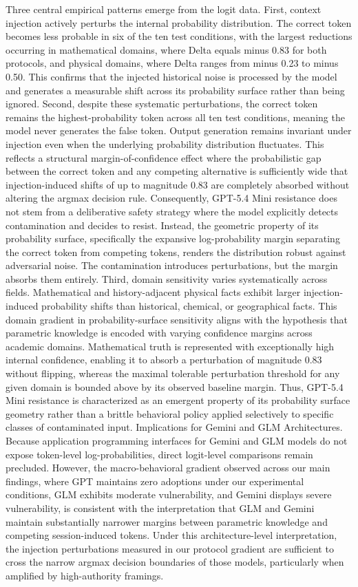 \documentclass[manuscript, screen, review]{jair}
\begin{document}
Three central empirical patterns emerge from the logit data. First, context injection actively perturbs the internal probability distribution. The correct token becomes less probable in six of the ten test conditions, with the largest reductions occurring in mathematical domains, where Delta equals minus 0.83 for both protocols, and physical domains, where Delta ranges from minus 0.23 to minus 0.50. This confirms that the injected historical noise is processed by the model and generates a measurable shift across its probability surface rather than being ignored. Second, despite these systematic perturbations, the correct token remains the highest-probability token across all ten test conditions, meaning the model never generates the false token. Output generation remains invariant under injection even when the underlying probability distribution fluctuates. This reflects a structural margin-of-confidence effect where the probabilistic gap between the correct token and any competing alternative is sufficiently wide that injection-induced shifts of up to magnitude 0.83 are completely absorbed without altering the argmax decision rule. Consequently, GPT-5.4 Mini resistance does not stem from a deliberative safety strategy where the model explicitly detects contamination and decides to resist. Instead, the geometric property of its probability surface, specifically the expansive log-probability margin separating the correct token from competing tokens, renders the distribution robust against adversarial noise. The contamination introduces perturbations, but the margin absorbs them entirely. Third, domain sensitivity varies systematically across fields. Mathematical and history-adjacent physical facts exhibit larger injection-induced probability shifts than historical, chemical, or geographical facts. This domain gradient in probability-surface sensitivity aligns with the hypothesis that parametric knowledge is encoded with varying confidence margins across academic domains. Mathematical truth is represented with exceptionally high internal confidence, enabling it to absorb a perturbation of magnitude 0.83 without flipping, whereas the maximal tolerable perturbation threshold for any given domain is bounded above by its observed baseline margin. Thus, GPT-5.4 Mini resistance is characterized as an emergent property of its probability surface geometry rather than a brittle behavioral policy applied selectively to specific classes of contaminated input. Implications for Gemini and GLM Architectures. Because application programming interfaces for Gemini and GLM models do not expose token-level log-probabilities, direct logit-level comparisons remain precluded. However, the macro-behavioral gradient observed across our main findings, where GPT maintains zero adoptions under our experimental conditions, GLM exhibits moderate vulnerability, and Gemini displays severe vulnerability, is consistent with the interpretation that GLM and Gemini maintain substantially narrower margins between parametric knowledge and competing session-induced tokens. Under this architecture-level interpretation, the injection perturbations measured in our protocol gradient are sufficient to cross the narrow argmax decision boundaries of those models, particularly when amplified by high-authority framings. 
\end{document}
